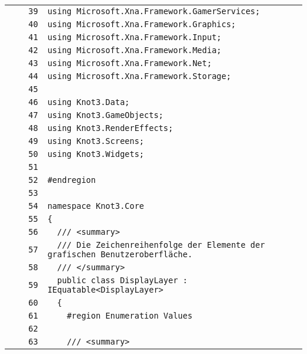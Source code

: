 \documentclass[a4paper,10pt]{article}
\begin{document}
\begin{longtable}[l]{lrrl}
\cellcolor{gray} &  & \verb~39~ & \verb~using Microsoft.Xna.Framework.GamerServices;~\\
\cellcolor{gray} &  & \verb~40~ & \verb~using Microsoft.Xna.Framework.Graphics;~\\
\cellcolor{gray} &  & \verb~41~ & \verb~using Microsoft.Xna.Framework.Input;~\\
\cellcolor{gray} &  & \verb~42~ & \verb~using Microsoft.Xna.Framework.Media;~\\
\cellcolor{gray} &  & \verb~43~ & \verb~using Microsoft.Xna.Framework.Net;~\\
\cellcolor{gray} &  & \verb~44~ & \verb~using Microsoft.Xna.Framework.Storage;~\\
\cellcolor{gray} &  & \verb~45~ & \verb~~\\
\cellcolor{gray} &  & \verb~46~ & \verb~using Knot3.Data;~\\
\cellcolor{gray} &  & \verb~47~ & \verb~using Knot3.GameObjects;~\\
\cellcolor{gray} &  & \verb~48~ & \verb~using Knot3.RenderEffects;~\\
\cellcolor{gray} &  & \verb~49~ & \verb~using Knot3.Screens;~\\
\cellcolor{gray} &  & \verb~50~ & \verb~using Knot3.Widgets;~\\
\cellcolor{gray} &  & \verb~51~ & \verb~~\\
\cellcolor{gray} &  & \verb~52~ & \verb~#endregion~\\
\cellcolor{gray} &  & \verb~53~ & \verb~~\\
\cellcolor{gray} &  & \verb~54~ & \verb~namespace Knot3.Core~\\
\cellcolor{gray} &  & \verb~55~ & \verb~{~\\
\cellcolor{gray} &  & \verb~56~ & \verb~  /// <summary>~\\
\cellcolor{gray} &  & \verb~57~ & \verb~  /// Die Zeichenreihenfolge der Elemente der grafischen Benutzeroberfläche.~\\
\cellcolor{gray} &  & \verb~58~ & \verb~  /// </summary>~\\
\cellcolor{gray} &  & \verb~59~ & \verb~  public class DisplayLayer : IEquatable<DisplayLayer>~\\
\cellcolor{gray} &  & \verb~60~ & \verb~  {~\\
\cellcolor{gray} &  & \verb~61~ & \verb~    #region Enumeration Values~\\
\cellcolor{gray} &  & \verb~62~ & \verb~~\\
\cellcolor{gray} &  & \verb~63~ & \verb~    /// <summary>~\\

\end{longtable}
\end{document}
